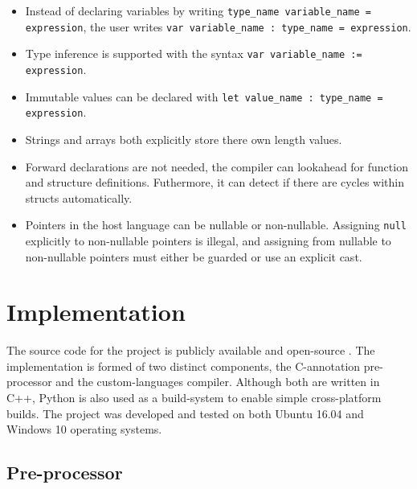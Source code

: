 \documentclass[a4paper,12pt,twoside,openright]{report}
\begin{document}
\begin{itemize}

    \item Instead of declaring variables by writing \texttt{type\_name
    variable\_name = expression}, the user writes \texttt{var variable\_name :
    type\_name = expression}.

    \item Type inference is supported with the syntax \texttt{var variable\_name
    := expression}.

    \item Immutable values can be declared with \texttt{let value\_name :
    type\_name = expression}.

    \item Strings and arrays both explicitly store there own length values.

    \item Forward declarations are not needed, the compiler can lookahead for
    function and structure definitions. Futhermore, it can detect if there are
    cycles within structs automatically.

    \item Pointers in the host language can be nullable or non-nullable.
    Assigning \texttt{null} explicitly to non-nullable pointers is illegal, and
    assigning from nullable to non-nullable pointers must either be guarded or
    use an explicit cast.

\end{itemize}

\chapter{Implementation}


The source code for the project is publicly available and open-source
\cite{ProjectSource}. The implementation is formed of two distinct components,
the C-annotation pre-processor and the custom-languages compiler. Although both
are written in C++, Python is also used as a build-system to enable simple
cross-platform builds. The project was developed and tested on both Ubuntu
16.04 and Windows 10 operating systems.

\section{Pre-processor}
\end{document}
